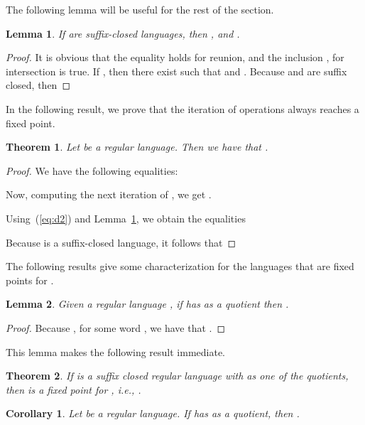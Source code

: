 \documentclass{article}
\newtheorem{lemma}{Lemma}
\newtheorem{theorem}{Theorem}
\newtheorem{corollary}{Corollary}
\begin{document}
The following lemma will be useful for the rest of the section.

\begin{lemma}
\label{lsufcap}
 If  are suffix-closed languages, then
, and 
.
\end{lemma}
\begin{proof}
It is obvious that the equality holds for reunion, and  
the inclusion , for intersection is true.
If , then
there exist  such that  and . 
Because  and  are suffix closed, then

\end{proof}

In the following result, we prove that the iteration of 
operations always reaches a fixed point. 

\begin{theorem}
\label{theo:fixpoint}
Let  be a regular language. 
Then we have that  
  .
\end{theorem}

\begin{proof}
We have the following equalities:

  
Now, computing the next iteration of , we get
 .

Using~(\ref{eq:d2}) and Lemma~\ref{lsufcap},  we obtain the equalities

Because  is a suffix-closed language, it follows that

\end{proof}

The following results give some characterization for the languages
that are fixed points for . 

\begin{lemma}
\label{lem:qempty}
Given a regular language , if  has  as a quotient then .
\end{lemma}

\begin{proof}
Because , for some word , we have that
. 
\end{proof}
This lemma makes the following result immediate.
\begin{theorem}
\label{theo:ldirectdead}
 If  is a suffix closed regular language with  as one of the
 quotients,  then  is a fixed point for , i.e., .
\end{theorem}

\begin{corollary}
\label{cor:emptyquotient}
Let  be a regular language. If  has  as a quotient, then .
 \end{corollary}
\end{document}
